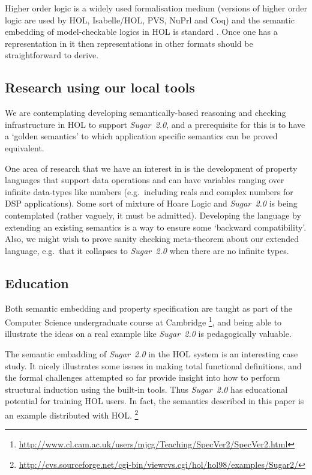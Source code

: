 \documentclass{llncs}
\newcommand\Sugar{{\it{Sugar~2.0}}\xspace}
\newcommand\Hol{HOL\xspace}
\newcommand\HOL{\Hol}
\begin{document}
Higher order logic is a widely used formalisation medium
(versions of higher order logic are used by \Hol, Isabelle/HOL, PVS,
NuPrl and Coq) and the semantic embedding of model-checkable logics in HOL
is standard \cite{Rajan95:CAV,Nipkow-Paulson-Wenzel:2002}. Once one has
a representation in it then representations in other formats should be
straightforward to derive.

\vspace*{-3mm}

\subsection{Research using our local tools}


We are contemplating developing semantically-based reasoning and
checking infrastructure in \HOL to support \Sugar, and a prerequisite
for this is to have a `golden semantics' to which application specific
semantics can be proved equivalent.

One area of research that we have an interest in is the development of property
languages that support data operations and can have variables
ranging over infinite data-types like numbers
(e.g.~including reals and complex numbers for DSP applications). Some
sort of mixture of Hoare Logic and \Sugar is being contemplated
(rather vaguely, it must be admitted).  Developing the language by
extending an existing semantics is a way to ensure some `backward
compatibility'.  Also, we might wish to prove sanity checking
meta-theorem about our extended language, e.g.~that it collapses to
\Sugar when there are no infinite types.

\vspace*{-3mm}

\subsection{Education}

Both semantic embedding and property specification are taught as part
of the Computer Science undergraduate course at
Cambridge%
\footnote{\url{http://www.cl.cam.ac.uk/users/mjcg/Teaching/SpecVer2/SpecVer2.html}},
and being able to illustrate the ideas on a real example like \Sugar
is pedagogically valuable.

The semantic embadding of \Sugar in the \Hol system is an interesting case
study. It nicely illustrates some issues in making total functional
definitions, and the formal challenges attempted so far provide
insight into how to perform structural induction using the built-in
tools.  Thus \Sugar has educational potential for training \Hol
users. In fact, the semantics described in this paper is an
example distributed with \Hol.%
\footnote%
{\url{http://cvs.sourceforge.net/cgi-bin/viewcvs.cgi/hol/hol98/examples/Sugar2/}}
\end{document}
